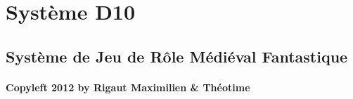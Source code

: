 \documentclass[12pt]{book}
\begin{document}
\chapter*{\Huge \center Système D10}
\thispagestyle{empty}
\section*{\center Système de Jeu de Rôle Médiéval Fantastique}

\begin{table}[b]
\begin{center}
    \subsubsection*{Copyleft 2012 by Rigaut Maximilien \& Théotime}
    \\[2.5ex]
    {\tiny\CcNote{\CcLongnameByNcSa}}
    \vspace*{-2.5ex}
\end{center}
\end{table} 

\frontmatter
 


\tableofcontents

\mainmatter





\end{document}
